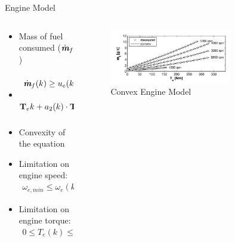\documentclass{beamer}
\begin{document}
\begin{frame}{Engine Model}
\begin{columns}
\begin{column}{0.5\textwidth}
\begin{itemize}
    \item Mass of fuel consumed ($\dot{\textit{\textbf{m}}}_f$)
    
    \item \begin{align*}
        \dot{\textit{\textbf{m}}}_f(k) \geq u_e(k)\cdot \bigg\{a_0&(k)+a_1(k)\cdot \\ \textbf{T}_e{k}+a_2(k)\cdot \textbf{T}_e^2(k)\bigg\}
    \end{align*}
    
    \item Convexity of the equation
    
    \item Limitation on engine speed:
    \begin{align*}
        \omega_{e,min} \leq \omega_e(k) \leq \omega_{e,max}
    \end{align*}
    
    \item Limitation on engine torque:
    \begin{align*}
        0 \leq T_e(k) \leq T_e(\omega_e(k))
    \end{align*}

\end{itemize}
\end{column}


\begin{column}{0.5\textwidth}
    \begin{figure}
    \centering
        \includegraphics[width=0.7\textwidth, height=1\textwidth]{engine model.jpeg}
        \caption{Convex Engine Model}
    \end{figure}
\end{column}


\end{columns}
\end{frame}
\end{document}
